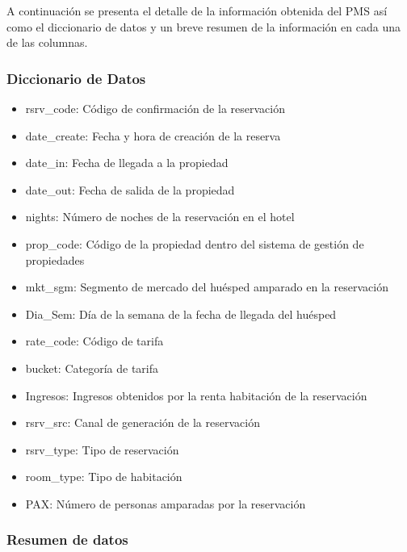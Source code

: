 A continuación se presenta el detalle de la información obtenida del PMS así como el diccionario de datos y un breve resumen de la información en cada una de las columnas.

\subsubsection*{Diccionario de Datos}


\begin{itemize}
  \item rsrv\_code: Código de confirmación de la reservación
  \item date\_create: Fecha y hora de creación de la reserva
  \item date\_in: Fecha de llegada a la propiedad
  \item date\_out: Fecha de salida de la propiedad
  \item nights: Número de noches de la reservación en el hotel
  \item prop\_code: Código de la propiedad dentro del sistema de gestión de propiedades
  \item mkt\_sgm: Segmento de mercado del huésped amparado en la reservación
  \item Dia\_Sem: Día de la semana de la fecha de llegada del huésped
  \item rate\_code: Código de tarifa
  \item bucket: Categoría de tarifa
  \item Ingresos: Ingresos obtenidos por la renta habitación de la reservación
  \item rsrv\_src: Canal de generación de la reservación
  \item rsrv\_type: Tipo de reservación
  \item room\_type: Tipo de habitación
  \item PAX: Número de personas amparadas por la reservación
\end{itemize}

\subsubsection*{Resumen de datos}

